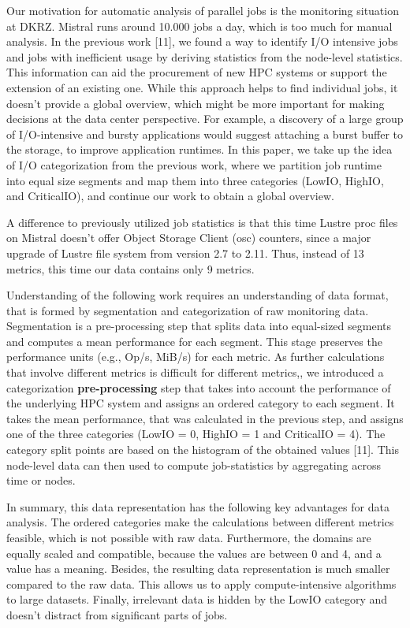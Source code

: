 \documentclass[]{llncs}
\begin{document}
Our motivation for automatic analysis of parallel jobs is the monitoring situation at DKRZ.
Mistral runs around 10.000 jobs a day, which is too much for manual analysis.
In the previous work [11], we found a way to identify I/O intensive jobs and jobs with inefficient usage by deriving statistics from the node-level statistics.
This information can aid the procurement of new HPC systems or support the extension of an existing one.
While this approach helps to find individual jobs, it doesn’t provide a global overview, which might be more important for making decisions at the data center perspective.
For example, a discovery of a large group of I/O-intensive and bursty applications would suggest attaching a burst buffer to the storage, to improve application runtimes.
In this paper, we take up the idea of I/O categorization from the previous work, where we partition job runtime into equal size segments and map them into three categories (LowIO, HighIO, and CriticalIO), and continue our work to obtain a global overview.

A difference to previously utilized job statistics is that this time Lustre proc files on Mistral doesn’t offer Object Storage Client (osc) counters, since a major upgrade of Lustre file system from version 2.7 to 2.11.
Thus, instead of 13 metrics, this time our data contains only 9 metrics.

Understanding of the following work requires an understanding of data format, that is formed by segmentation and categorization of raw monitoring data.
Segmentation is a pre-processing step that splits data into equal-sized segments and computes a mean performance for each segment.
This stage preserves the performance units (e.g., Op/s, MiB/s) for each metric.
As further calculations that involve different metrics is difficult for different metrics,, we introduced a categorization\textbf{ pre-processing} step that takes into account the performance of the underlying HPC system and assigns an ordered category to each segment.
It takes the mean performance, that was calculated in the previous step, and assigns one of the three categories (LowIO = 0, HighIO = 1 and CriticalIO = 4).
The category split points are based on the histogram of the obtained values [11].
This node-level data can then used to compute job-statistics by aggregating across time or nodes.

In summary, this data representation has the following key advantages for data analysis.
The ordered categories make the calculations between different metrics feasible, which is not possible with raw data.
Furthermore, the domains are equally scaled and compatible, because the values are between 0 and 4, and a value has a meaning.
Besides, the resulting data representation is much smaller compared to the raw data.
This allows us to apply compute-intensive algorithms to large datasets.
Finally, irrelevant data is hidden by the LowIO category and doesn’t distract from significant parts of jobs.
\end{document}
